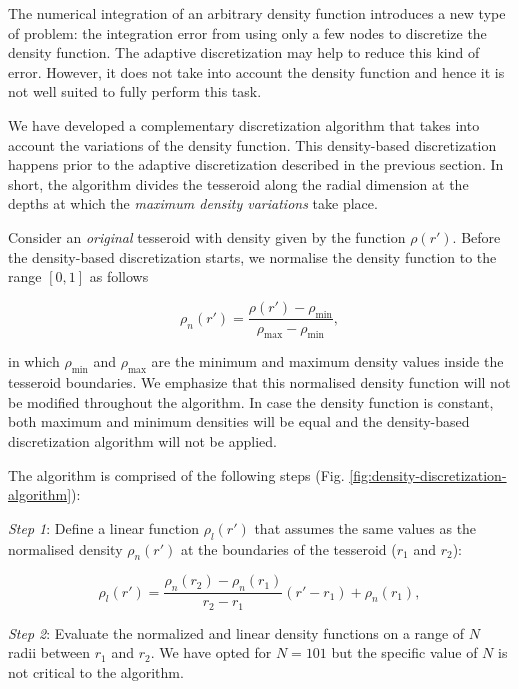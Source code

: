 \documentclass[extra]{gji}
\begin{document}
The numerical integration of an arbitrary density function introduces
a new type of problem:
the integration error from using only a few nodes to discretize the density function.
The adaptive discretization may help
to reduce this kind of error.
However, it does not take into account the density function
and hence it is not well suited to fully perform this task.

We have developed a complementary discretization
algorithm that takes into account the variations of the density function.
This density-based discretization happens prior to the adaptive discretization described
in the previous section.
In short, the algorithm divides the tesseroid along the radial dimension at the
depths at which the \emph{maximum density variations} take place.

Consider an \emph{original} tesseroid with density given by the function $\rho(r')$.
Before the density-based discretization starts,
we normalise the density function to the range $[0, 1]$ as follows

\begin{equation}
    \rho_n(r') =
    \frac{\rho(r') - \rho_\text{min}}{\rho_\text{max} - \rho_\text{min}},
\end{equation}

\noindent in which $\rho_\text{min}$ and $\rho_\text{max}$ are the minimum and maximum
density values inside the tesseroid boundaries.
We emphasize that this normalised density function will not be modified throughout the
algorithm.
In case the density function is constant, both maximum and minimum densities will be
equal and the density-based discretization algorithm will not be applied.

The algorithm is comprised of the following steps
(Fig. \ref{fig:density-discretization-algorithm}):

\textit{Step 1}:
Define a linear function $\rho_l(r')$ that assumes
the same values as the normalised density $\rho_n(r')$ at the boundaries of the
tesseroid ($r_1$ and $r_2$):

\begin{equation}
    \rho_l(r') =
    \frac{ \rho_n(r_2) - \rho_n(r_1) }{ r_2 - r_1 } (r' - r_1) + \rho_n(r_1),
    \label{eq:density-reference-line}
\end{equation}

\textit{Step 2}:
Evaluate the normalized and linear density functions on a range of $N$ radii between
$r_1$ and $r_2$.
We have opted for $N = 101$ but the specific value of $N$ is not critical to the
algorithm.
\end{document}
